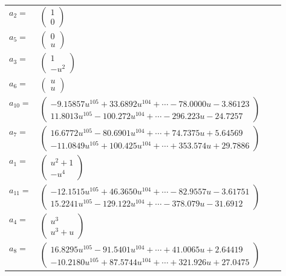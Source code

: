 \documentclass[1p]{elsarticle_modified}
\theoremstyle{definition}
\begin{document}
\begin{tabular}{m{7pt} m{180pt} m{7pt} m{180pt} }
\flushright $a_{2}=$&$\begin{pmatrix}1\\0\end{pmatrix}$ \\
\flushright $a_{5}=$&$\begin{pmatrix}0\\u\end{pmatrix}$ \\
\flushright $a_{3}=$&$\begin{pmatrix}1\\- u^2\end{pmatrix}$ \\
\flushright $a_{6}=$&$\begin{pmatrix}u\\u\end{pmatrix}$ \\
\flushright $a_{10}=$&$\begin{pmatrix}-9.15857 u^{105}+33.6892 u^{104}+\cdots-78.0000 u-3.86123\\11.8013 u^{105}-100.272 u^{104}+\cdots-296.223 u-24.7257\end{pmatrix}$ \\
\flushright $a_{7}=$&$\begin{pmatrix}16.6772 u^{105}-80.6901 u^{104}+\cdots+74.7375 u+5.64569\\-11.0849 u^{105}+100.425 u^{104}+\cdots+353.574 u+29.7886\end{pmatrix}$ \\
\flushright $a_{1}=$&$\begin{pmatrix}u^2+1\\- u^4\end{pmatrix}$ \\
\flushright $a_{11}=$&$\begin{pmatrix}-12.1515 u^{105}+46.3650 u^{104}+\cdots-82.9557 u-3.61751\\15.2241 u^{105}-129.122 u^{104}+\cdots-378.079 u-31.6912\end{pmatrix}$ \\
\flushright $a_{4}=$&$\begin{pmatrix}u^3\\u^3+u\end{pmatrix}$ \\
\flushright $a_{8}=$&$\begin{pmatrix}16.8295 u^{105}-91.5401 u^{104}+\cdots+41.0065 u+2.64419\\-10.2180 u^{105}+87.5744 u^{104}+\cdots+321.926 u+27.0475\end{pmatrix}$ \\

\end{tabular}
\end{document}
